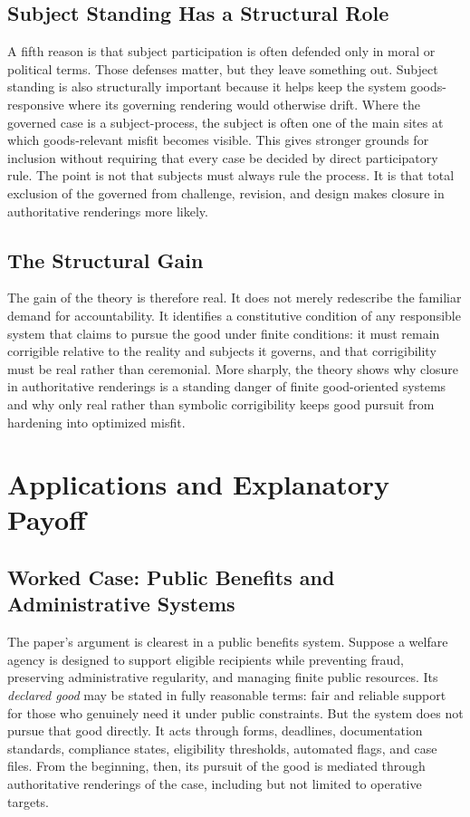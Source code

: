 \documentclass[11pt]{article}
\renewcommand{\emph}[1]{\textit{#1}}
\begin{document}
\subsection{Subject Standing Has a Structural Role}

A fifth reason is that subject participation is often defended only in moral or political terms. Those defenses matter, but they leave something out. Subject standing is also structurally important because it helps keep the system goods-responsive where its governing rendering would otherwise drift. Where the governed case is a subject-process, the subject is often one of the main sites at which goods-relevant misfit becomes visible.\cite{Fricker2007EpistemicInjustice} This gives stronger grounds for inclusion without requiring that every case be decided by direct participatory rule. The point is not that subjects must always rule the process. It is that total exclusion of the governed from challenge, revision, and design makes closure in authoritative renderings more likely.

\subsection{The Structural Gain}

The gain of the theory is therefore real. It does not merely redescribe the familiar demand for accountability. It identifies a constitutive condition of any responsible system that claims to pursue the good under finite conditions: it must remain corrigible relative to the reality and subjects it governs, and that corrigibility must be real rather than ceremonial. More sharply, the theory shows why closure in authoritative renderings is a standing danger of finite good-oriented systems and why only real rather than symbolic corrigibility keeps good pursuit from hardening into optimized misfit.
\section{Applications and Explanatory Payoff}

\subsection{Worked Case: Public Benefits and Administrative Systems}

The paper's argument is clearest in a public benefits system. Suppose a welfare agency is designed to support eligible recipients while preventing fraud, preserving administrative regularity, and managing finite public resources. Its \emph{declared good} may be stated in fully reasonable terms: fair and reliable support for those who genuinely need it under public constraints. But the system does not pursue that good directly. It acts through forms, deadlines, documentation standards, compliance states, eligibility thresholds, automated flags, and case files. From the beginning, then, its pursuit of the good is mediated through authoritative renderings of the case, including but not limited to operative targets.\cite{Scott1998SeeingLikeState,MoynihanHerdHarvey2015AdministrativeBurden,Eubanks2018AutomatingInequality}
\end{document}
